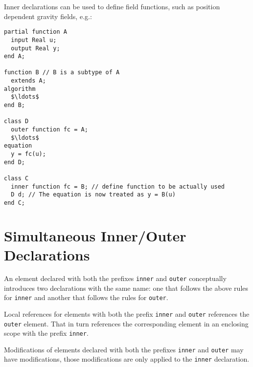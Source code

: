 \begin{nonnormative}
Inner declarations can be used to define field functions, such
as position dependent gravity fields, e.g.:
\begin{lstlisting}[language=modelica]
partial function A
  input Real u;
  output Real y;
end A;

function B // B is a subtype of A
  extends A;
algorithm
  $\ldots$
end B;

class D
  outer function fc = A;
  $\ldots$
equation
  y = fc(u);
end D;

class C
  inner function fc = B; // define function to be actually used
  D d; // The equation is now treated as y = B(u)
end C;
\end{lstlisting}
\end{nonnormative}

\section{Simultaneous Inner/Outer Declarations}\label{simultaneous-inner-outer-declarations}

An element declared with both the prefixes \lstinline!inner! and \lstinline!outer! conceptually
introduces two declarations with the same name: one that follows the
above rules for \lstinline!inner! and another that follows the rules for \lstinline!outer!.

\begin{nonnormative}
Local references for elements with both the prefix \lstinline!inner! and \lstinline!outer! references the \lstinline!outer! element.  That in turn references the corresponding
element in an enclosing scope with the prefix \lstinline!inner!.
\end{nonnormative}

Modifications of elements declared with both the prefixes \lstinline!inner! and \lstinline!outer!
may have modifications, those modifications are only applied to the
\lstinline!inner! declaration.

